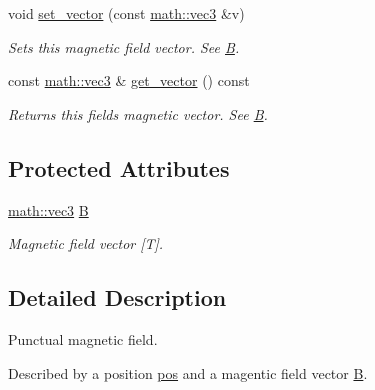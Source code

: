 \begin{DoxyCompactItemize}
void \hyperlink{classphysim_1_1fields_1_1magnetic_a405a791a9e5a711eb6a43de73462c609}{set\+\_\+vector} (const \hyperlink{structphysim_1_1math_1_1vec3}{math\+::vec3} \&v)
\begin{DoxyCompactList}\small\item\em Sets this magnetic field vector. See \hyperlink{classphysim_1_1fields_1_1magnetic_a9955f0d4a3773ff96b536f37623b5ac7}{B}. \end{DoxyCompactList}\item 
\mbox{\label{classphysim_1_1fields_1_1magnetic_a279376a78adda4e96bc02aef38cb54bd}} 
const \hyperlink{structphysim_1_1math_1_1vec3}{math\+::vec3} \& \hyperlink{classphysim_1_1fields_1_1magnetic_a279376a78adda4e96bc02aef38cb54bd}{get\+\_\+vector} () const
\begin{DoxyCompactList}\small\item\em Returns this field\textquotesingle{}s magnetic vector. See \hyperlink{classphysim_1_1fields_1_1magnetic_a9955f0d4a3773ff96b536f37623b5ac7}{B}. \end{DoxyCompactList}\end{DoxyCompactItemize}
\subsection*{Protected Attributes}
\begin{DoxyCompactItemize}
\item 
\mbox{\label{classphysim_1_1fields_1_1magnetic_a9955f0d4a3773ff96b536f37623b5ac7}} 
\hyperlink{structphysim_1_1math_1_1vec3}{math\+::vec3} \hyperlink{classphysim_1_1fields_1_1magnetic_a9955f0d4a3773ff96b536f37623b5ac7}{B}
\begin{DoxyCompactList}\small\item\em Magnetic field vector \mbox{[}T\mbox{]}. \end{DoxyCompactList}\end{DoxyCompactItemize}


\subsection{Detailed Description}
Punctual magnetic field. 

Described by a position \hyperlink{classphysim_1_1fields_1_1punctual_a00344d6f3e4f3f841e7d876918c66977}{pos} and a magentic field vector \hyperlink{classphysim_1_1fields_1_1magnetic_a9955f0d4a3773ff96b536f37623b5ac7}{B}.

